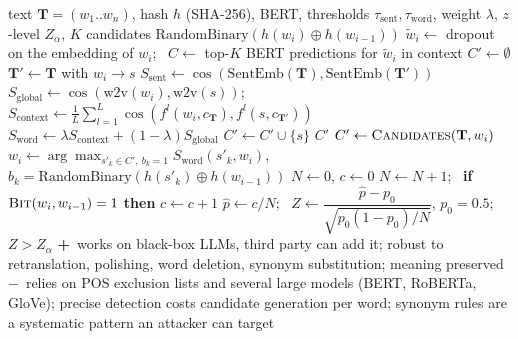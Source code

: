\documentclass[10pt,a4paper,twocolumn]{article}
\newcommand{\pro}[1]{\Statex\textcolor{proc}{\textbf{+}\ #1}}
\newcommand{\con}[1]{\Statex\textcolor{conc}{\textbf{$-$}\ #1}}
\begin{document}
\begin{algorithm}[H]\small
\caption{Black-box synonym watermark (Yang et al.\ 2023)}
\begin{algorithmic}[1]
\Require text $\mathbf T=(w_1..w_n)$, hash $h$ (SHA-256), BERT, thresholds $\tau_{\mathrm{sent}},\tau_{\mathrm{word}}$, weight $\lambda$, $z$-level $Z_\alpha$, $K$ candidates
 \State \Return $\mathrm{RandomBinary}(h(w_i)\oplus h(w_{i-1}))$ \EndFunction
{}
 \State $\tilde w_i\gets$ dropout on the embedding of $w_i$; \ $C\gets$ top-$K$ BERT predictions for $\tilde w_i$ in context
 \State $C'\gets\emptyset$
  \State $\mathbf T'\gets\mathbf T$ with $w_i\to s$
  \State $S_{\mathrm{sent}}\gets\cos(\mathrm{SentEmb}(\mathbf T),\mathrm{SentEmb}(\mathbf T'))$ 
  \State $S_{\mathrm{global}}\gets\cos(\mathrm{w2v}(w_i),\mathrm{w2v}(s))$; \ $S_{\mathrm{context}}\gets\frac1L\sum_{l=1}^L\cos(f^l(w_i,c_{\mathbf T}),f^l(s,c_{\mathbf T'}))$
  \State $S_{\mathrm{word}}\gets\lambda S_{\mathrm{context}}+(1-\lambda)S_{\mathrm{global}}$
   \State $C'\gets C'\cup\{s\}$ \EndIf
 \EndFor
 \State \Return $C'$
\EndFunction
{}
   \State $C'\gets\textsc{Candidates}(\mathbf T,w_i)$
   \State $w_i\gets\arg\max_{s'_k\in C',\ b_k=1}S_{\mathrm{word}}(s'_k,w_i)$, \ $b_k=\mathrm{RandomBinary}(h(s'_k)\oplus h(w_{i-1}))$
  \EndIf
 \EndFor
\EndProcedure
{}
 \State $N\gets0$, $c\gets0$
   
   \State $N\gets N+1$; \ \textbf{if} $\textsc{Bit}(w_i,w_{i-1})=1$ \textbf{then} $c\gets c+1$
  \EndIf
 \EndFor
 \State $\hat p\gets c/N$; \ $Z\gets\dfrac{\hat p-p_0}{\sqrt{p_0(1-p_0)/N}}$, $p_0=0.5$; \ \Return $Z>Z_\alpha$
\EndProcedure
\pro{works on black-box LLMs, third party can add it; robust to retranslation, polishing, word deletion, synonym substitution; meaning preserved}
\con{relies on POS exclusion lists and several large models (BERT, RoBERTa, GloVe); precise detection costs candidate generation per word; synonym rules are a systematic pattern an attacker can target}
\end{algorithmic}
\end{algorithm}
\end{document}
